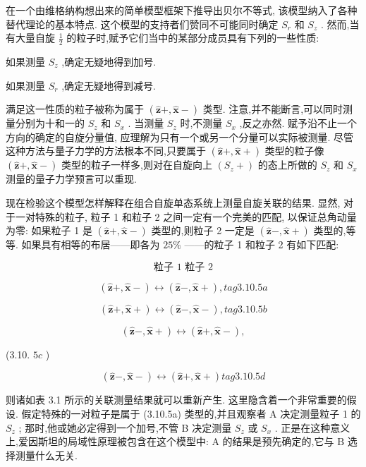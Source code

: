 在一个由维格纳构想出来的简单模型框架下推导出贝尔不等式, 该模型纳入了各种替代理论的基本特点. 这个模型的支持者们赞同不可能同时确定 ${S}_{r}$ 和 ${S}_{z}$ . 然而,当有大量自旋 $\frac{1}{2}$ 的粒子时,赋予它们当中的某部分成员具有下列的一些性质:

如果测量 ${S}_{z}$ ,确定无疑地得到加号.

如果测量 ${S}_{r}$ ,确定无疑地得到减号.

满足这一性质的粒子被称为属于 $\left( {\widehat{\mathbf{z}} + ,\widehat{\mathbf{x}} - }\right)$ 类型. 注意,并不能断言,可以同时测量分别为十和一的 ${S}_{z}$ 和 ${S}_{x}$ . 当测量 ${S}_{z}$ 时,不测量 ${S}_{x}$ ,反之亦然. 赋予沿不止一个方向的确定的自旋分量值, 应理解为只有一个或另一个分量可以实际被测量. 尽管这种方法与量子力学的方法根本不同,只要属于 $\left( {\widehat{\mathbf{z}}+,\widehat{\mathbf{x}} + }\right)$ 类型的粒子像 $\left( {\widehat{\mathbf{z}}+,\widehat{\mathbf{x}} - }\right)$ 类型的粒子一样多,则对在自旋向上 $\left( {{S}_{z} + }\right)$ 的态上所做的 ${S}_{z}$ 和 ${S}_{x}$ 测量的量子力学预言可以重现.

现在检验这个模型怎样解释在组合自旋单态系统上测量自旋关联的结果. 显然, 对于一对特殊的粒子, 粒子 1 和粒子 2 之间一定有一个完美的匹配, 以保证总角动量为零: 如果粒子 1 是 $\left( {\widehat{\mathbf{z}}+,\widehat{\mathbf{x}} - }\right)$ 类型的,则粒子 2 一定是 $\left( {\widehat{\mathbf{z}}-,\widehat{\mathbf{x}} + }\right)$ 类型的,等等. 如果具有相等的布居——即各为 ${25}\%$ ——的粒子 1 和粒子 2 有如下匹配:

$$
\text{粒子 1 粒子 2}
$$

$$
\left( {\widehat{\mathbf{z}}+,\widehat{\mathbf{x}} - }\right) \leftrightarrow \left( {\widehat{\mathbf{z}}-,\widehat{\mathbf{x}} + }\right) , tag{3.10.5a}
$$

$$
\left( {\widehat{\mathbf{z}}+,\widehat{\mathbf{x}} + }\right) \leftrightarrow \left( {\widehat{\mathbf{z}}-,\widehat{\mathbf{x}} - }\right) , tag{3.10.5b}
$$

$$
\left( {\widehat{\mathbf{z}}-,\widehat{\mathbf{x}} + }\right) \leftrightarrow \left( {\widehat{\mathbf{z}}+,\widehat{\mathbf{x}} - }\right) ,
$$

(3.10. ${5c}$ )

$$
\left( {\widehat{\mathbf{z}}-,\widehat{\mathbf{x}} - }\right) \leftrightarrow \left( {\widehat{\mathbf{z}}+,\widehat{\mathbf{x}} + }\right) tag{3.10.5d}
$$

则诸如表 3.1 所示的关联测量结果就可以重新产生. 这里隐含着一个非常重要的假设. 假定特殊的一对粒子是属于 (3.10.5a) 类型的,并且观察者 $\mathrm{A}$ 决定测量粒子 1 的 ${S}_{z}$ ; 那时,他或她必定得到一个加号,不管 B 决定测量 ${S}_{z}$ 或 ${S}_{x}$ . 正是在这种意义上,爱因斯坦的局域性原理被包含在这个模型中: $\mathrm{A}$ 的结果是预先确定的,它与 $\mathrm{B}$ 选择测量什么无关.

